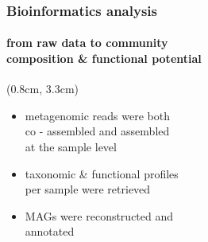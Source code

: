 \documentclass{beamer}
\begin{document}
   \begin{frame}
      \frametitle{Bioinformatics analysis}
      \framesubtitle{from raw data to community \\ composition \& functional potential}


      \begin{textblock*}{6cm}(0.8cm, 3.3cm)
         \small 

         \begin{itemize}

            \item metagenomic reads were both \\
            co - assembled and assembled \\
            at the sample level 
            \item taxonomic \& functional profiles \\
            per sample were retrieved \\ 
            \item MAGs were reconstructed and \\
            annotated

         \end{itemize}
      \end{textblock*}

   \end{frame}
\end{document}
